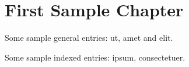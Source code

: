 \chapter{First Sample Chapter}

Some sample general entries: \gls{ut}, \gls{amet} and \gls{elit}.

Some sample indexed entries: \gls{ipsum}, \gls{consectetuer}.
